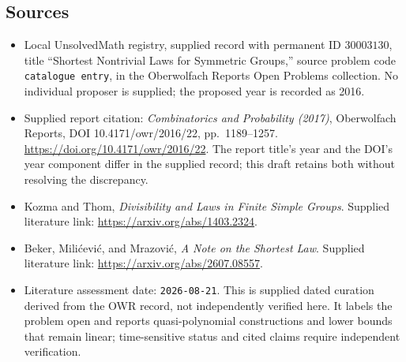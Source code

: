 \documentclass[11pt]{article}
\begin{document}
\subsection{Sources}
\begin{itemize}
\item Local UnsolvedMath registry, supplied record with permanent ID \(30003130\), title ``Shortest Nontrivial Laws for Symmetric Groups,'' source problem code \texttt{catalogue entry}, in the Oberwolfach Reports Open Problems collection. No individual proposer is supplied; the proposed year is recorded as 2016.
\item Supplied report citation: \emph{Combinatorics and Probability (2017)}, Oberwolfach Reports, DOI 10.4171/owr/2016/22, pp.\ 1189--1257. \url{https://doi.org/10.4171/owr/2016/22}. The report title's year and the DOI's year component differ in the supplied record; this draft retains both without resolving the discrepancy.
\item Kozma and Thom, \emph{Divisibility and Laws in Finite Simple Groups}. Supplied literature link: \url{https://arxiv.org/abs/1403.2324}.
\item Beker, Milićević, and Mrazović, \emph{A Note on the Shortest Law}. Supplied literature link: \url{https://arxiv.org/abs/2607.08557}.
\item Literature assessment date: \texttt{2026-08-21}. This is supplied dated curation derived from the OWR record, not independently verified here. It labels the problem open and reports quasi-polynomial constructions and lower bounds that remain linear; time-sensitive status and cited claims require independent verification.
\end{itemize}
\end{document}
